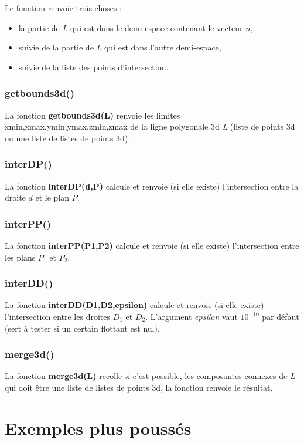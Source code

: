 Le fonction renvoie trois choses :
\begin{itemize}
    \item la partie de \emph{L} qui est dans le demi-espace contenant le vecteur $n$,
    \item suivie de la partie de \emph{L} qui est dans l'autre demi-espace,
    \item suivie de la liste des points d'intersection.
\end{itemize}

\subsubsection{getbounds3d()}
La fonction \textbf{getbounds3d(L)} renvoie les limites xmin,xmax,ymin,ymax,zmin,zmax de la ligne polygonale 3d \emph{L} (liste de points 3d ou une liste de listes de points 3d).

\subsubsection{interDP()}
La fonction \textbf{interDP(d,P)} calcule et renvoie (si elle existe) l'intersection entre la droite $d$ et le plan $P$.

\subsubsection{interPP()}
La fonction \textbf{interPP(P1,P2)} calcule et renvoie (si elle existe) l'intersection entre les plans $P_1$ et $P_2$.

\subsubsection{interDD()}
La fonction \textbf{interDD(D1,D2,epsilon)} calcule et renvoie (si elle existe) l'intersection entre les droites $D_1$ et $D_2$. L'argument \emph{epsilon} vaut $10^{-10}$ par défaut (sert à tester si un certain flottant est nul).

\subsubsection{merge3d()}
La fonction \textbf{merge3d(L)} recolle si c'est possible, les composantes connexes de \emph{L} qui doit être une liste de listes de points 3d, la fonction renvoie le résultat.

\section{Exemples plus poussés}

